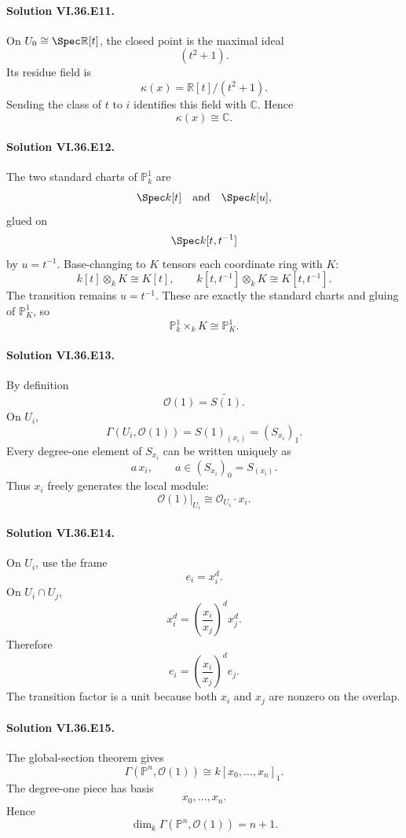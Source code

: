 \paragraph{Solution VI.36.E11.}
On \(U_0\cong\Spec\mathbb R[t]\), the closed point is the maximal ideal
\[
(t^2+1).
\]
Its residue field is
\[
\kappa(x)
=
\mathbb R[t]/(t^2+1).
\]
Sending the class of \(t\) to \(i\) identifies this field with \(\mathbb C\). Hence
\[
\boxed{\kappa(x)\cong\mathbb C}.
\]

\paragraph{Solution VI.36.E12.}
The two standard charts of \(\mathbb P^1_k\) are
\[
\Spec k[t]
\quad\text{and}\quad
\Spec k[u],
\]
glued on
\[
\Spec k[t,t^{-1}]
\]
by \(u=t^{-1}\). Base-changing to \(K\) tensors each coordinate ring with \(K\):
\[
k[t]\otimes_kK\cong K[t],
\qquad
k[t,t^{-1}]\otimes_kK\cong K[t,t^{-1}].
\]
The transition remains \(u=t^{-1}\). These are exactly the standard charts and gluing of \(\mathbb P^1_K\), so
\[
\boxed{\mathbb P^1_k\times_kK\cong\mathbb P^1_K}.
\]

\paragraph{Solution VI.36.E13.}
By definition
\[
\mathcal O(1)=\widetilde{S(1)}.
\]
On \(U_i\),
\[
\Gamma(U_i,\mathcal O(1))
=
S(1)_{(x_i)}
=
(S_{x_i})_1.
\]
Every degree-one element of \(S_{x_i}\) can be written uniquely as
\[
a\,x_i,
\qquad
a\in(S_{x_i})_0=S_{(x_i)}.
\]
Thus \(x_i\) freely generates the local module:
\[
\boxed{\mathcal O(1)|_{U_i}\cong\mathcal O_{U_i}\cdot x_i}.
\]

\paragraph{Solution VI.36.E14.}
On \(U_i\), use the frame
\[
e_i=x_i^d.
\]
On \(U_i\cap U_j\),
\[
x_i^d
=
\left(\frac{x_i}{x_j}\right)^d x_j^d.
\]
Therefore
\[
\boxed{
e_i
=
\left(\frac{x_i}{x_j}\right)^d e_j.
}
\]
The transition factor is a unit because both \(x_i\) and \(x_j\) are nonzero on the overlap.

\paragraph{Solution VI.36.E15.}
The global-section theorem gives
\[
\Gamma(\mathbb P^n,\mathcal O(1))
\cong
k[x_0,\ldots,x_n]_1.
\]
The degree-one piece has basis
\[
x_0,\ldots,x_n.
\]
Hence
\[
\boxed{
\dim_k\Gamma(\mathbb P^n,\mathcal O(1))=n+1.
}
\]

